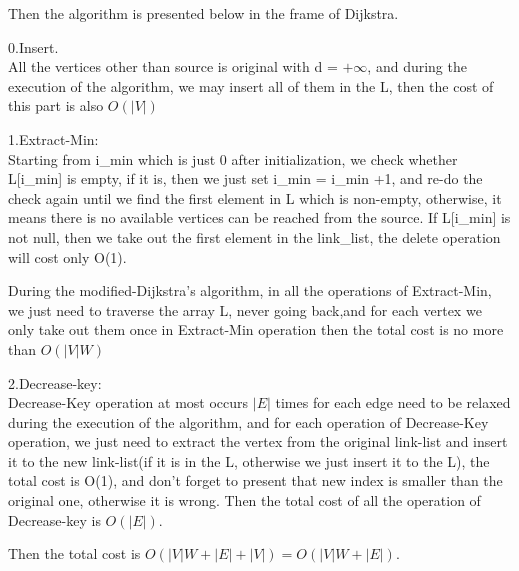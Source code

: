 \documentclass[oneside]{homework} %
\begin{document}
Then the algorithm is presented below in the frame of Dijkstra.

0.Insert.\\
All the vertices other than source is original with d = $+\infty$, and during the execution of the algorithm, we may insert all of them in the L, then the cost of this part is also $O(|V|)$

1.Extract-Min:\\
Starting from i\_min which is just 0 after initialization, we check whether L[i\_min] is empty, if it is, then we just set i\_min = i\_min +1, and re-do the check again until we find the first element in L which is non-empty, otherwise, it means there is no available vertices can be reached from the source. If L[i\_min] is not null, then we take out the first element in the link\_list, the delete operation will cost only O(1).

During the modified-Dijkstra's algorithm, in all the operations of Extract-Min, we just need to traverse the array L, never going back,and for each vertex we only take out them once in Extract-Min operation then the total cost is no more than $O(|V|W)$

2.Decrease-key:\\
Decrease-Key operation at most occurs $|E|$ times for each edge need to be relaxed during the execution of the algorithm, and for each operation of Decrease-Key operation, we just need to extract the vertex from the original link-list and insert it to the new link-list(if it is in the L, otherwise we just insert it to the L), the total cost is O(1), and don't forget to present that new index is smaller than the original one, otherwise it is wrong.
Then the total cost of all the operation of Decrease-key is $O(|E|)$.


Then the total cost is $O(|V|W + |E| + |V|) = O(|V|W + |E|)$.
\end{document}

